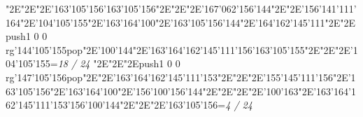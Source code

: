 \null\vfill\enskip\enskip\enskip\ipa\char"2E\enskip\enskip\enskip\ipa\char"2E\enskip\ipa\char"2E\ipa\char'163\ipa\char'105\ipa\char'156\bigskip\ipa\char'163\ipa\char'105\ipa\char'156\ipa\char"2E\enskip\enskip\enskip\ipa\char"2E\enskip\enskip\enskip\enskip\enskip\enskip\bigskip\enskip\enskip\ipa\char"2E\ipa\char'167\ipa\char'062\ipa\char'156\ipa\char'144\ipa\char"2E\enskip\ipa\char"2E\ipa\char'156\ipa\char'141\ipa\char'111\ipa\char'164\ipa\char"2E\ipa\char'104\ipa\char'105\ipa\char'155\ipa\char"2E\ipa\char'163\ipa\char'164\ipa\char'100\ipa\char"2E\ipa\char'163\ipa\char'105\ipa\char'156\ipa\char'144\bigskip\enskip\ipa\char"2E\ipa\char'164\ipa\char'162\ipa\char'145\ipa\char'111\ipa\char"2E\enskip\enskip\ipa\char"2E\pdfcolorstack\match push{1 0 0 rg}\ipa\char'144\ipa\char'105\ipa\char'155\pdfcolorstack\match pop{}\ipa\char"2E\ipa\char'100\ipa\char'144\ipa\char"2E\ipa\char'163\ipa\char'164\ipa\char'162\ipa\char'145\ipa\char'111\ipa\char'156\bigskip\ipa\char'163\ipa\char'105\ipa\char'155\ipa\char"2E\enskip\enskip\ipa\char"2E\enskip\enskip\enskip\ipa\char"2E\ipa\char'104\ipa\char'105\ipa\char'155\bigskip\vfill\footline={\hfill\tenrm\it 18 / 24}\eject
\null\vfill\enskip\enskip\enskip\ipa\char"2E\enskip\enskip\enskip\ipa\char"2E\enskip\ipa\char"2E\pdfcolorstack\match push{1 0 0 rg}\ipa\char'147\ipa\char'105\ipa\char'156\pdfcolorstack\match pop{}\bigskip\enskip\enskip\enskip\ipa\char"2E\enskip\enskip\enskip\ipa\char"2E\ipa\char'163\ipa\char'164\ipa\char'162\ipa\char'145\ipa\char'111\ipa\char'153\bigskip\enskip\enskip\ipa\char"2E\enskip\enskip\enskip\enskip\ipa\char"2E\enskip\ipa\char"2E\ipa\char'155\ipa\char'145\ipa\char'111\ipa\char'156\ipa\char"2E\ipa\char'163\ipa\char'105\ipa\char'156\ipa\char"2E\ipa\char'163\ipa\char'164\ipa\char'100\ipa\char"2E\ipa\char'156\ipa\char'100\ipa\char'156\ipa\char'144\bigskip\enskip\ipa\char"2E\enskip\enskip\enskip\enskip\ipa\char"2E\enskip\enskip\ipa\char"2E\enskip\enskip\enskip\ipa\char"2E\ipa\char'100\ipa\char'163\ipa\char"2E\ipa\char'163\ipa\char'164\ipa\char'162\ipa\char'145\ipa\char'111\ipa\char'153\bigskip\ipa\char'156\ipa\char'100\ipa\char'144\ipa\char"2E\enskip\enskip\ipa\char"2E\enskip\enskip\enskip\ipa\char"2E\ipa\char'163\ipa\char'105\ipa\char'156\bigskip\vfill\footline={\hfill\tenrm\it 4 / 24}\eject\bye